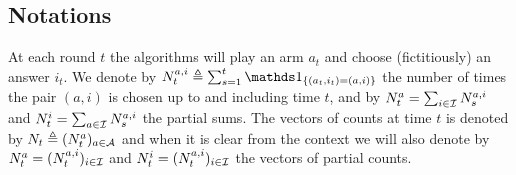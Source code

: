 



\subsection{Notations}

At each round $t$ the algorithms will play an arm $a_t$ and choose (fictitiously) an answer $i_t$. We denote by $N_t^{a,i} \eqdef\sum_{s=1}^t \ind_{\{(a_t,i_t)=(a,i)\}}$ the number of times the pair $(a,i)$ is chosen up to and including time $t$, and by $N_t^a =\sum_{i\in\mathcal{I}} N_s^{a,i}$ and $N_t^i =\sum_{a\in\mathcal{I}} N_s^{a,i}$ the partial sums. The vectors of counts at time $t$ is denoted by $N_t \triangleq (N_t^a)_{a\in\mathcal{A}}$
and when it is clear from the context we will also denote by $N_t^a = (N_t^{a,i})_{i\in\mathcal{I}}$ and $N_t^i = (N_t^{a,i})_{i\in\mathcal{I}}$ the vectors of partial counts.

